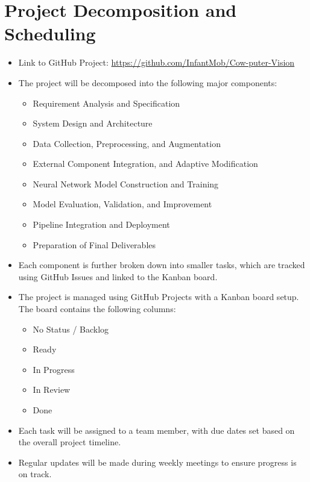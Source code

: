 \documentclass{article}
\begin{document}
\section{Project Decomposition and Scheduling}


\begin{itemize}
  \item Link to GitHub Project: \url{https://github.com/InfantMob/Cow-puter-Vision}
  \item The project will be decomposed into the following major components:
    \begin{itemize}
      \item Requirement Analysis and Specification
      \item System Design and Architecture
      \item Data Collection, Preprocessing, and Augmentation
      \item External Component Integration, and Adaptive Modification
      \item Neural Network Model Construction and Training
      \item Model Evaluation, Validation, and Improvement
      \item Pipeline Integration and Deployment
      \item Preparation of Final Deliverables
    \end{itemize}
  \item Each component is further broken down into smaller tasks, which are tracked using GitHub Issues and linked to the Kanban board.
  \item The project is managed using GitHub Projects with a Kanban board setup. 
        The board contains the following columns: 
        \begin{itemize}
          \item No Status / Backlog
          \item Ready
          \item In Progress
          \item In Review
          \item Done
        \end{itemize}  \item Each task will be assigned to a team member, with due dates set based on the overall project timeline.
  \item Regular updates will be made during weekly meetings to ensure progress is on track.
\end{itemize}
\end{document}
